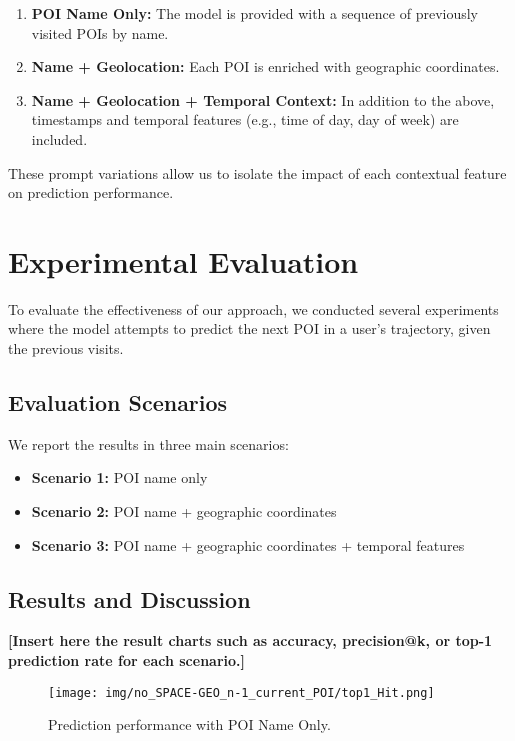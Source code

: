 \documentclass[a4paper,12pt]{article}
\begin{document}
\begin{enumerate}
    \item \textbf{POI Name Only:} The model is provided with a sequence of previously visited POIs by name.
    \item \textbf{Name + Geolocation:} Each POI is enriched with geographic coordinates.
    \item \textbf{Name + Geolocation + Temporal Context:} In addition to the above, timestamps and temporal features (e.g., time of day, day of week) are included.
\end{enumerate}

These prompt variations allow us to isolate the impact of each contextual feature on prediction performance.
\clearpage
\section{Experimental Evaluation}

To evaluate the effectiveness of our approach, we conducted several experiments where the model attempts to predict the next POI in a user's trajectory, given the previous visits.

\subsection{Evaluation Scenarios}

We report the results in three main scenarios:

\begin{itemize}
    \item \textbf{Scenario 1:} POI name only
    \item \textbf{Scenario 2:} POI name + geographic coordinates
    \item \textbf{Scenario 3:} POI name + geographic coordinates + temporal features
\end{itemize}

\subsection{Results and Discussion} \par

\textbf{[Insert here the result charts such as accuracy, precision@k, or top-1 prediction rate for each scenario.]}

\begin{figure}[H]
    \centering
    \texttt{[image: img/no\_SPACE-GEO\_n-1\_current\_POI/top1\_Hit.png]}
    \caption{Prediction performance with POI Name Only.}
\end{figure}
\end{document}
